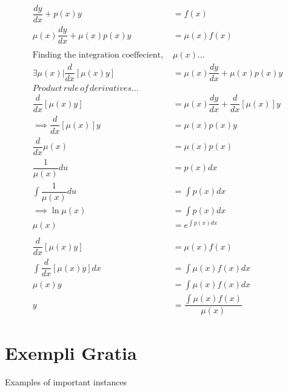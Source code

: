 \documentclass{article}
\begin{document}
\begin{align*}
\dfrac{dy}{dx}+p(x)y&=f(x)\\
\mu(x)\dfrac{dy}{dx}+\mu(x)p(x)y&=\mu(x)f(x)\\\\
\text{Finding the integration coeffecient, }&\mu(x)...\\
\exists\mu(x)|\dfrac{d}{dx}[\mu(x)y]&=\mu(x)\dfrac{dy}{dx}+\mu(x)p(x)y\\
Product\,rule\,of\,derivatives...\\
\dfrac{d}{dx}[\mu(x)y]&=\mu(x)\dfrac{dy}{dx}+\dfrac{d}{dx}[\mu(x)]y\\
\implies\dfrac{d}{dx}[\mu(x)]y&=\mu(x)p(x)y\\
\dfrac{d}{dx}\mu(x)&=\mu(x)p(x)\\
\dfrac{1}{\mu(x)}du&=p(x)dx\\
\int\dfrac{1}{\mu(x)}du&=\int p(x)dx\\
\implies \ln\mu(x)&=\int p(x)dx\\
\mu(x)&=e^{\int p(x)dx}\\\\
\dfrac{d}{dx}[\mu(x)y]&=\mu(x)f(x)\\
\int\dfrac{d}{dx}[\mu(x)y]dx&=\int\mu(x)f(x)dx\\
\mu(x)y&=\int\mu(x)f(x)dx\\
y&=\dfrac{\int\mu(x)f(x)}{\mu(x)}
\end{align*}

\section{Exempli Gratia}

Examples of important instances
\end{document}
